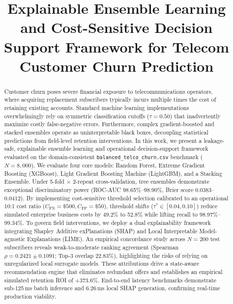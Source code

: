 \documentclass[conference]{IEEEtran}
\begin{document}
\title{Explainable Ensemble Learning and Cost-Sensitive Decision Support Framework for Telecom Customer Churn Prediction}

\author{
}

\maketitle

\begin{abstract}
Customer churn poses severe financial exposure to telecommunications operators, where acquiring replacement subscribers typically incurs multiple times the cost of retaining existing accounts. Standard machine learning implementations overwhelmingly rely on symmetric classification cutoffs ($\tau = 0.50$) that inadvertently maximize costly false-negative errors. Furthermore, complex gradient-boosted and stacked ensembles operate as uninterpretable black boxes, decoupling statistical predictions from field-level retention interventions. In this work, we present a leakage-safe, explainable ensemble learning and operational decision-support framework evaluated on the domain-consistent \texttt{balanced\_telco\_churn.csv} benchmark ($N = 8,000$). We evaluate four core models: Random Forest, Extreme Gradient Boosting (XGBoost), Light Gradient Boosting Machine (LightGBM), and a Stacking Ensemble. Under 5-fold $\times$ 2-repeat cross-validation, tree ensembles demonstrate exceptional discriminatory power (ROC-AUC 98.65\%--98.90\%, Brier score 0.0383--0.0412). By implementing cost-sensitive threshold selection calibrated to an operational 10:1 cost ratio ($C_{\text{FN}}=\$500, C_{\text{FP}}=\$50$), threshold shifts ($\tau^* \in [0.04, 0.10]$) reduce simulated enterprise business costs by 49.2\% to 52.8\% while lifting recall to 98.97\%--99.34\%. To govern field interventions, we deploy a dual explainability framework integrating Shapley Additive exPlanations (SHAP) and Local Interpretable Model-agnostic Explanations (LIME). An empirical concordance study across $N = 200$ test subscribers reveals weak-to-moderate ranking agreement (Spearman $\rho = 0.2421 \pm 0.1091$; Top-3 overlap 22.83\%), highlighting the risks of relying on unregularized local surrogate models. These attributions drive a state-aware recommendation engine that eliminates redundant offers and establishes an empirical simulated retention ROI of +373.6\%. End-to-end latency benchmarks demonstrate sub-125\,ms batch inference and 6.26\,ms local SHAP generation, confirming real-time production viability.
\end{abstract}
\end{document}
